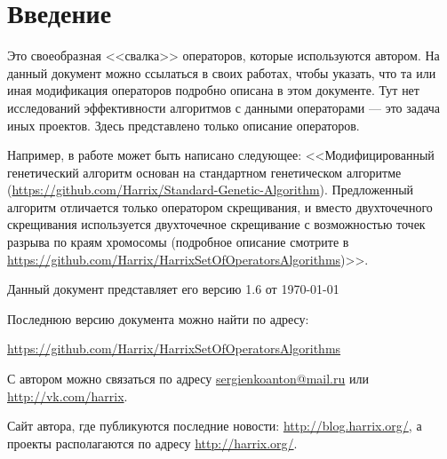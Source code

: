 \section{Введение}

Это своеобразная <<свалка>> операторов, которые используются автором. На данный документ можно ссылаться в своих работах, чтобы указать, что та или иная модификация операторов подробно описана в этом документе. Тут нет исследований эффективности алгоритмов с данными операторами --- это задача иных проектов. Здесь представлено только описание операторов.

Например, в работе может быть написано следующее: <<Модифицированный генетический алгоритм основан на стандартном генетическом алгоритме (\href{https://github.com/Harrix/Standard-Genetic-Algorithm}{https://github.com/Harrix/Standard-Genetic-Algorithm}). Предложенный алгоритм отличается только оператором скрещивания, и вместо двухточечного скрещивания используется двухточечное скрещивание с возможностью точек разрыва по краям хромосомы (подробное описание смотрите в \href{https://github.com/Harrix/HarrixSetOfOperatorsAlgorithms}{https://github.com/Harrix/HarrixSetOfOperatorsAlgorithms})>>.

Данный документ представляет его версию 1.6 от \today

Последнюю версию документа можно найти по адресу:

\href{https://github.com/Harrix/HarrixSetOfOperatorsAlgorithms}{https://github.com/Harrix/HarrixSetOfOperatorsAlgorithms}

С автором можно связаться по адресу \href{mailto:sergienkoanton@mail.ru}{sergienkoanton@mail.ru} или  \href{http://vk.com/harrix}{http://vk.com/harrix}.

Сайт автора, где публикуются последние новости: \href{http://blog.harrix.org/}{http://blog.harrix.org/}, а проекты располагаются по адресу \href{http://harrix.org/}{http://harrix.org/}.